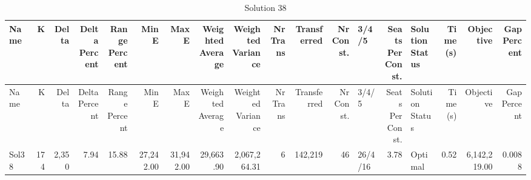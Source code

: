 \documentclass[a4paper]{article}
\begin{document}
{\scriptsize
\begin{longtable}{lrrrrrrrrrrrlrlrrr}
\caption{Solution 38}
\\ \toprule
Name &K &Delta &\shortstack{Delta\\Percent} &\shortstack{Range\\Percent} &Min E &Max E &\shortstack{Weighted\\Average} &\shortstack{Weighted\\Variance} &\shortstack{Nr\\Trans} &Transferred &\shortstack{Nr\\Const.} &3/4/5 &\shortstack{Seats\\Per\\Const.} &\shortstack{Solution\\Status} &\shortstack{Time\\(s)} &Objective &\shortstack{Gap\\Percent} \\ \midrule
\endfirsthead
\toprule
Name &K &Delta &\shortstack{Delta\\Percent} &\shortstack{Range\\Percent} &Min E &Max E &\shortstack{Weighted\\Average} &\shortstack{Weighted\\Variance} &\shortstack{Nr\\Trans} &Transferred &\shortstack{Nr\\Const.} &3/4/5 &\shortstack{Seats\\Per\\Const.} &\shortstack{Solution\\Status} &\shortstack{Time\\(s)} &Objective &\shortstack{Gap\\Percent} \\ \midrule
\endhead
\bottomrule
\endfoot
Sol38&174&2,350& 7.94&15.88&27,242.00&31,942.00&29,663.90&2,067,264.31&6&142,219&46&26/4/16& 3.78&Optimal& 0.52&6,142,219.00&0.0088\\ 
\end{longtable}

}
\end{document}

